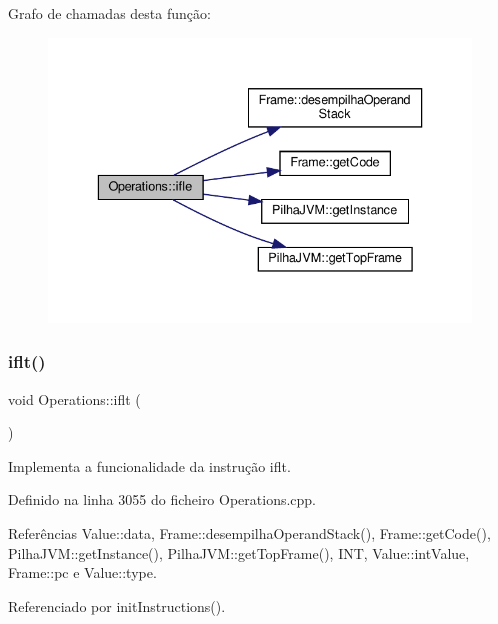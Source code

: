 Grafo de chamadas desta função\+:
\nopagebreak
\begin{figure}[H]
\begin{center}
\leavevmode
\includegraphics[width=336pt]{classOperations_a1ef1754372db2e5285a129389274dcc8_cgraph}
\end{center}
\end{figure}
\mbox{\label{classOperations_a0a9460ea938fc3a9bbd2102578d50ee2}} 
\subsubsection{\texorpdfstring{iflt()}{iflt()}}
{\footnotesize\ttfamily void Operations\+::iflt (\begin{DoxyParamCaption}{ }\end{DoxyParamCaption})\hspace{0.3cm}{\ttfamily [private]}}



Implementa a funcionalidade da instrução iflt. 



Definido na linha 3055 do ficheiro Operations.\+cpp.



Referências Value\+::data, Frame\+::desempilha\+Operand\+Stack(), Frame\+::get\+Code(), Pilha\+J\+V\+M\+::get\+Instance(), Pilha\+J\+V\+M\+::get\+Top\+Frame(), I\+NT, Value\+::int\+Value, Frame\+::pc e Value\+::type.



Referenciado por init\+Instructions().

